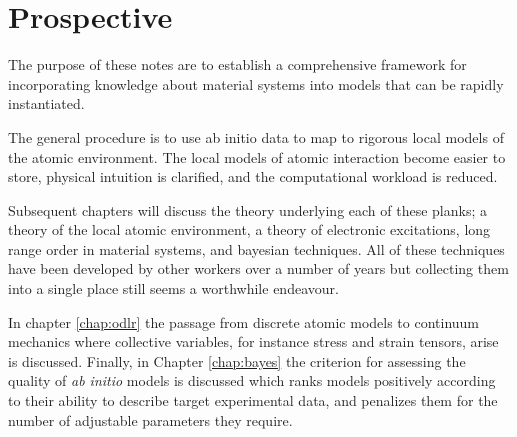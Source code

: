 \section{Prospective}
The purpose of these notes are to establish a comprehensive framework 
for incorporating knowledge about material systems into models that can be rapidly
instantiated.

The general procedure is to use ab initio data to map 
to rigorous local models of the atomic environment. The local models
of atomic interaction become easier to store, physical intuition is clarified,
and the computational workload is reduced. 

Subsequent chapters will discuss the theory underlying each of these planks; a
theory of the local atomic environment, a theory of electronic excitations, long
range order in material systems, and bayesian techniques. All of these techniques
have been developed by other workers over a number of years but collecting 
them into a single place still seems a worthwhile endeavour.

In chapter \ref{chap:odlr} the passage from discrete atomic models to continuum mechanics
where collective variables, for instance stress and strain tensors, arise is discussed. 
Finally, in Chapter \ref{chap:bayes} the criterion for assessing the quality of {\it ab initio} 
models is discussed which ranks models positively according to their ability to 
describe target experimental data, and penalizes them for the number of 
adjustable parameters they require.

